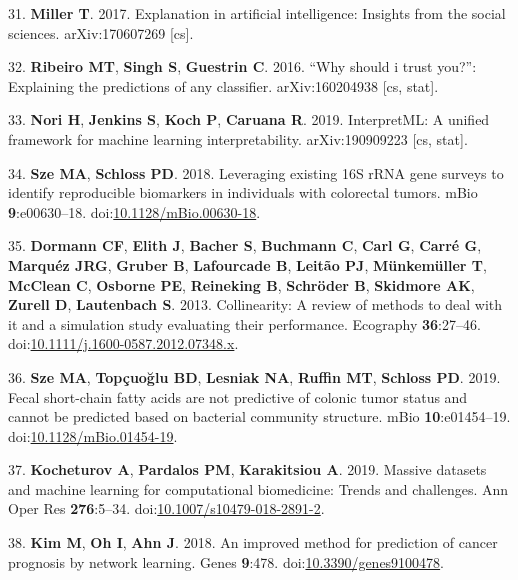 \documentclass[11pt,]{article}
\begin{document}
\hypertarget{ref-miller_explanation_2017}{}
31. \textbf{Miller T}. 2017. Explanation in artificial intelligence:
Insights from the social sciences. arXiv:170607269 {[}cs{]}.

\hypertarget{ref-ribeiro_why_2016}{}
32. \textbf{Ribeiro MT}, \textbf{Singh S}, \textbf{Guestrin C}. 2016.
``Why should i trust you?'': Explaining the predictions of any
classifier. arXiv:160204938 {[}cs, stat{]}.

\hypertarget{ref-nori_interpretml:_2019}{}
33. \textbf{Nori H}, \textbf{Jenkins S}, \textbf{Koch P},
\textbf{Caruana R}. 2019. InterpretML: A unified framework for machine
learning interpretability. arXiv:190909223 {[}cs, stat{]}.

\hypertarget{ref-sze_leveraging_2018}{}
34. \textbf{Sze MA}, \textbf{Schloss PD}. 2018. Leveraging existing 16S
rRNA gene surveys to identify reproducible biomarkers in individuals
with colorectal tumors. mBio \textbf{9}:e00630--18.
doi:\href{https://doi.org/10.1128/mBio.00630-18}{10.1128/mBio.00630-18}.

\hypertarget{ref-dormann_collinearity:_2013}{}
35. \textbf{Dormann CF}, \textbf{Elith J}, \textbf{Bacher S},
\textbf{Buchmann C}, \textbf{Carl G}, \textbf{Carré G}, \textbf{Marquéz
JRG}, \textbf{Gruber B}, \textbf{Lafourcade B}, \textbf{Leitão PJ},
\textbf{Münkemüller T}, \textbf{McClean C}, \textbf{Osborne PE},
\textbf{Reineking B}, \textbf{Schröder B}, \textbf{Skidmore AK},
\textbf{Zurell D}, \textbf{Lautenbach S}. 2013. Collinearity: A review
of methods to deal with it and a simulation study evaluating their
performance. Ecography \textbf{36}:27--46.
doi:\href{https://doi.org/10.1111/j.1600-0587.2012.07348.x}{10.1111/j.1600-0587.2012.07348.x}.

\hypertarget{ref-sze_fecal_2019}{}
36. \textbf{Sze MA}, \textbf{Topçuoğlu BD}, \textbf{Lesniak NA},
\textbf{Ruffin MT}, \textbf{Schloss PD}. 2019. Fecal short-chain fatty
acids are not predictive of colonic tumor status and cannot be predicted
based on bacterial community structure. mBio \textbf{10}:e01454--19.
doi:\href{https://doi.org/10.1128/mBio.01454-19}{10.1128/mBio.01454-19}.

\hypertarget{ref-kocheturov_massive_2019}{}
37. \textbf{Kocheturov A}, \textbf{Pardalos PM}, \textbf{Karakitsiou A}.
2019. Massive datasets and machine learning for computational
biomedicine: Trends and challenges. Ann Oper Res \textbf{276}:5--34.
doi:\href{https://doi.org/10.1007/s10479-018-2891-2}{10.1007/s10479-018-2891-2}.

\hypertarget{ref-kim_improved_2018}{}
38. \textbf{Kim M}, \textbf{Oh I}, \textbf{Ahn J}. 2018. An improved
method for prediction of cancer prognosis by network learning. Genes
\textbf{9}:478.
doi:\href{https://doi.org/10.3390/genes9100478}{10.3390/genes9100478}.
\end{document}
